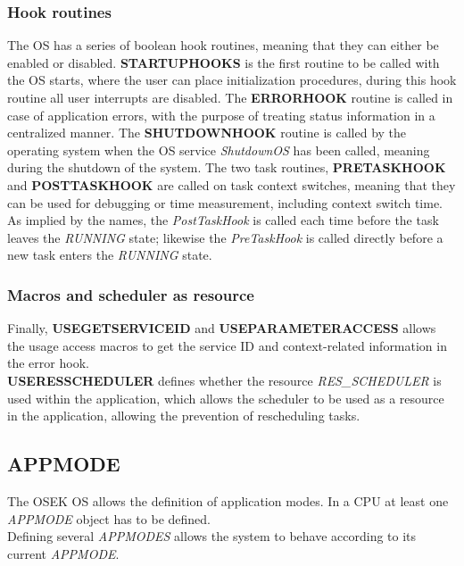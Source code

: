 \subsubsection*{Hook routines}
The OS has a series of boolean hook routines, meaning that they can either be enabled or disabled. 
\textbf{STARTUPHOOKS} is the first routine to be called with the OS starts, where the user can place initialization procedures, during this hook routine all user interrupts are disabled\cite{irisa223}.
The \textbf{ERRORHOOK} routine is called in case of application errors, with the purpose of treating status information in a centralized manner. 
The \textbf{SHUTDOWNHOOK} routine is called by the operating system when the OS service \textit{ShutdownOS} has been called, meaning during the shutdown of the system. 
The two task routines, \textbf{PRETASKHOOK} and \textbf{POSTTASKHOOK} are called on task context switches, meaning that they can be used for debugging or time measurement, including context switch time\cite{irisa223}.
As implied by the names, the \textit{PostTaskHook} is called each time before the task leaves the \textit{RUNNING} state; likewise the \textit{PreTaskHook} is called directly before a new task enters the \textit{RUNNING} state\cite{irisa223}.

\subsubsection*{Macros and scheduler as resource}
Finally, \textbf{USEGETSERVICEID} and \textbf{USEPARAMETERACCESS} allows the usage access macros to get the service ID and context-related information in the error hook.\\
\textbf{USERESSCHEDULER} defines whether the resource \textit{RES\_SCHEDULER} is used within the application, which allows the scheduler to be used as a resource in the application, allowing the prevention of rescheduling tasks\cite{irisa223}.

\subsection{APPMODE}
The OSEK OS allows the definition of application modes.
In a CPU at least one \textit{APPMODE} object has to be defined.\\
Defining several \textit{APPMODES} allows the system to behave according to its current \textit{APPMODE}\cite{irisa25}.

